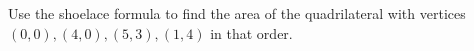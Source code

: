 Use the shoelace formula to find the area of the quadrilateral with vertices $(0,0),(4,0),(5,3),(1,4)$ in that order.
